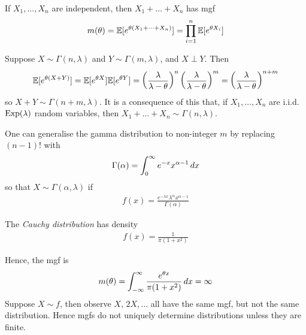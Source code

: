 \documentclass{../../template/note}
\begin{document}
    
    \begin{proposition}
        If \(X_1, \dots, X_n\) are independent, then \(X_1 + \dots + X_n\) has mgf
        \begin{align*}
            m(\theta) = \mathbb E[e^{\theta(X_1 + \dots + X_n)}] = \prod_{i=1}^n \mathbb E[e^{\theta X_i}]
        \end{align*}
    \end{proposition}
    
    \begin{example*}
        Suppose \(X \sim \Gamma(n, \lambda)\) and \(Y \sim \Gamma(m, \lambda)\), and \(X \perp Y\). Then
        \begin{align*}
            \mathbb E[e^{\theta(X+Y)}] = \mathbb E[e^{\theta X}]\mathbb E[e^{\theta Y}] = \left(\frac{\lambda}{\lambda-\theta}\right)^n \left(\frac{\lambda}{\lambda-\theta}\right)^m = \left(\frac{\lambda}{\lambda-\theta}\right)^{n+m}
        \end{align*}
        so \(X+Y \sim \Gamma(n+m,\lambda)\). It is a consequence of this that, if \(X_1, \dots, X_n\) are i.i.d. \(\operatorname{Exp}(\lambda)\) random variables, then \(X_1 + \dots + X_n \sim \Gamma(n, \lambda)\).
    \end{example*}
    
    \begin{remark*}
        One can generalise the gamma distribution to non-integer \(m\) by replacing \((n-1)!\) with
        \begin{align*}
            \Gamma(\alpha) = \int_0^{\infty} e^{-x} x^{\alpha-1} \,d{x}
        \end{align*}
        so that \(X \sim \Gamma(\alpha, \lambda)\) if
        \begin{align*}
            f(x) = \frac{e^{-\lambda x}\lambda^{\alpha}x^{\alpha-1}}{\Gamma(\alpha)}
        \end{align*}
    \end{remark*}

    \begin{definition}
        The \emph{Cauchy distribution} has density
        \begin{align*}
            f(x) = \frac{1}{\pi(1+x^2)}
        \end{align*}
    \end{definition}
    Hence, the mgf is
    \begin{align*}
        m(\theta) = \int_{-\infty}^{\infty} \frac{e^{\theta x}}{\pi(1+x^2)} \,d{x} = \infty
    \end{align*}
    Suppose \(X \sim f\), then observe \(X\), \(2X, \dots\) all have the same mgf, but not the same distribution. Hence mgfs do not uniquely determine distributions unless they are finite.
    
\end{document}
